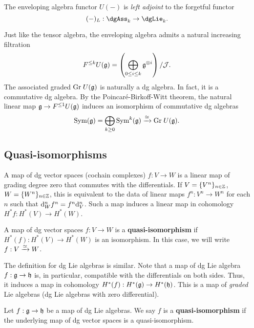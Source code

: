 \documentclass[11pt]{amsart}
\begin{document}
\begin{fact}
The enveloping algebra functor $U(-)$ is {\em left adjoint} to the forgetful functor 
\[
(-)_L : \dgAss_k \to \dgLie_k .
\]
\end{fact}

\begin{rmk}
Just like the tensor algebra, the enveloping algebra admits a natural increasing filtration
\[
F^{\leq k} U(\mathfrak g) = \left(\bigoplus_{0 \leq i \leq k} \mathfrak g^{\otimes i}\right) / \mathcal J .
\]
The associated graded ${\rm Gr} \; U(\mathfrak g)$ is naturally a dg algebra. 
In fact, it is a commutative dg algebra. 
By the Poincar\'{e}-Birkoff-Witt theorem, the natural linear map $\mathfrak g \to F^{\leq 1}U(\mathfrak g)$ induces an isomorphism of commutative dg algebras
\[
{\rm Sym}(\mathfrak g) = \bigoplus_{k \geq 0} {\rm Sym}^k(\mathfrak g) \xrightarrow{\cong} {\rm Gr} \; U(\mathfrak g) . 
\] 
\end{rmk}

\subsection{Quasi-isomorphisms}\label{sec: quasi}

A map of dg vector spaces (cochain complexes) $f : V \to W$ is a linear map of grading degree zero that commutes with the differentials. 
If $V = \{V^n\}_{n \in \mathbb Z}$, $W = \{W^n\}_{n \in \mathbb Z}$,
this is equivalent to the data of linear maps $f^n : V^n \to W^n$ for each $n$ such that ${\rm d}^n_W f^n = f^n {\rm d}^n_V$. 
Such a map induces a linear map in cohomology $H^*f : H^*(V) \to H^*(W)$. 

\begin{dfn}
A map of dg vector spaces $f : V \to W$ is a {\bf quasi-isomorphism} if $H^*(f) : H^*(V) \to H^*(W)$ is an isomorphism. 
In this case, we will write $f : V \xrightarrow{\simeq} W$. 
\end{dfn}

The definition for dg Lie algebras is similar. 
Note that a map of dg Lie algebra $f : \mathfrak g \to \mathfrak h$ is, in particular, compatible with the differentials on both sides. 
Thus, it induces a map in cohomology $H^*(f) : H^*(\mathfrak g) \to H^*(\mathfrak h)$.
This is a map of {\em graded} Lie algebras (dg Lie algebras with zero differential). 

\begin{dfn}
Let $f : \mathfrak g \to \mathfrak h$ be a map of dg Lie algebras. 
We say $f$ is a {\bf quasi-isomorphism} if the underlying map of dg vector spaces is a quasi-isomorphism.
\end{dfn}
\end{document}
